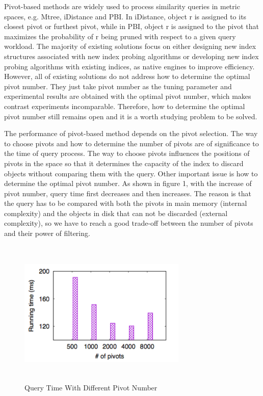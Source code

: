\documentclass{vldb}
\begin{document}
Pivot-based methods are widely used to process similarity queries in metric spaces, e.g. Mtree, iDistance and PBI. In iDistance, object r is assigned to its closest pivot or furthest pivot, while in PBI, object r is assigned to the pivot that maximizes the probability of r being pruned with respect to a given query workload. The majority of existing solutions focus on either designing new index structures associated with new index probing algorithms or developing new index probing algorithms with existing indices, as native engines to improve efficiency. However, all of existing solutions do not address how to determine the optimal pivot number. They just take pivot number as the tuning parameter and experimental results are obtained with the optimal pivot number, which makes contrast experiments incomparable. Therefore, how to determine the optimal pivot number still remains open and it is a worth studying problem to be solved.

The performance of pivot-based method depends on the pivot selection. The way to choose pivots and how to determine the number of pivots are of significance to the time of query process. The way to choose pivots influences the positions of pivots in the space so that it determines the capacity  of the index to discard objects without comparing them with the query. Other important issue is how to determine the optimal pivot number. As shown in figure 1, with the increase of pivot number, query time first decreases and then increases. The reason is that the query has to be compared with both the pivots in main memory (internal complexity) and the objects in disk that can not be discarded (external complexity), so we have to reach a good trade-off between the number of pivots and their power of filtering.

\begin{figure}[ht]
\centering
\includegraphics[width=8cm,height=7cm]{pivot}
\caption{Query Time With Different Pivot Number}
\label{fig:stream}
\end{figure}
\end{document}
